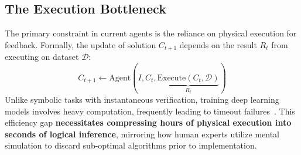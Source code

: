 




\subsection{The Execution Bottleneck}
\label{sec:motivation}

The primary constraint in current agents is the reliance on physical execution for feedback.
Formally, the update of solution $C_{t+1}$ depends on the result $R_t$ from executing on dataset $\mathcal{D}$:
\begin{equation}
    C_{t+1} \leftarrow \text{Agent}(I, C_t, \underbrace{\text{Execute}(C_t, \mathcal{D})}_{R_t})
\end{equation}
Unlike symbolic tasks with instantaneous verification, training deep learning models involves heavy computation, frequently leading to timeout failures~\cite{chan2025mlebenchevaluatingmachinelearning}.
This efficiency gap \textbf{necessitates compressing hours of physical execution into seconds of logical inference}, mirroring how human experts utilize mental simulation to discard sub-optimal algorithms prior to implementation.


